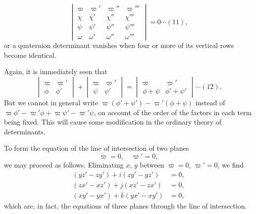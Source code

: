 \documentclass[12pt,a4paper]{article}
\begin{document}
\begin{equation}
\begin{vmatrix}
\varpi & \varpi' & \varpi'' & \varpi''' \\
\chi & \chi' & \chi'' & \chi''' \\
\psi & \psi' & \psi'' & \psi''' \\
\omega & \omega' & \omega'' & \omega'''
\end{vmatrix}
= 0 \cdots (11),
\end{equation}
or a quaternion determinant vanishes when four or more of its vertical rows become
identical.

\newpage
\setcounter{page}{125}

Again, it is immediately seen that
\begin{equation}
\begin{vmatrix}
\varpi & \varpi' \\
\phi & \phi'
\end{vmatrix}
+ \begin{vmatrix}
\varpi & \varpi' \\
\psi & \psi'
\end{vmatrix}
= \begin{vmatrix}
\varpi & \varpi' \\
\phi + \psi & \phi' + \psi'
\end{vmatrix} \cdots (12).
\end{equation}
But we cannot in general write $\varpi(\phi' + \psi') - \varpi'(\phi + \psi)$ instead of
$\varpi\phi' - \varpi'\phi + \varpi\psi' - \varpi'\psi$, on account of the order of the factors in each term
being fixed. This will cause some modification in the ordinary theory of determinants.

To form the equation of the line of intersection of two planes
\[
\varpi = 0,\quad \varpi' = 0,
\]
we may proceed as follows. Eliminating $x$, $y$ between $\varpi = 0$, $\varpi' = 0$, we find
\begin{align*}
(yz' - zy') + i(zy' - yz') &= 0,\\
(zx' - xz') + j(xz' - zx') &= 0,\\
(xy' - yx') + k(yx' - xy') &= 0,
\end{align*}
which are, in fact, the equations of three planes through the line of intersection.

\newpage
\setcounter{page}{126}
\end{document}
